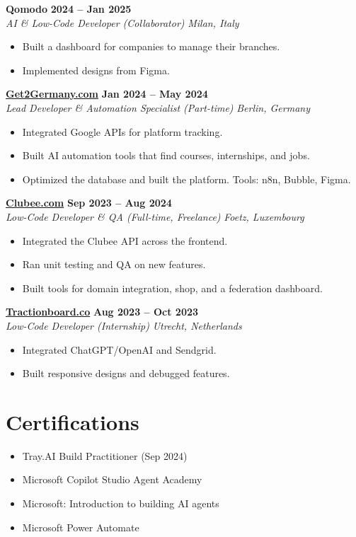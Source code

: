 \documentclass[a4paper,10pt]{article}
\newcommand{\role}[4]{%
  \textbf{#1} \hfill \textbf{#2}\\[1pt]%
  \textit{#3} \hfill \textit{#4}\\[2pt]%
}
\begin{document}
\role{Qomodo}{2024 -- Jan 2025}{AI \& Low-Code Developer (Collaborator)}{Milan, Italy}
\begin{itemize}
  \item Built a dashboard for companies to manage their branches.
  \item Implemented designs from Figma.
\end{itemize}

\role{\href{https://get2germany.com}{Get2Germany.com}}{Jan 2024 -- May 2024}{Lead Developer \& Automation Specialist (Part-time)}{Berlin, Germany}
\begin{itemize}
  \item Integrated Google APIs for platform tracking.
  \item Built AI automation tools that find courses, internships, and jobs.
  \item Optimized the database and built the platform. Tools: n8n, Bubble, Figma.
\end{itemize}

\role{\href{https://clubee.com}{Clubee.com}}{Sep 2023 -- Aug 2024}{Low-Code Developer \& QA (Full-time, Freelance)}{Foetz, Luxembourg}
\begin{itemize}
  \item Integrated the Clubee API across the frontend.
  \item Ran unit testing and QA on new features.
  \item Built tools for domain integration, shop, and a federation dashboard.
\end{itemize}

\role{\href{https://tractionboard.co}{Tractionboard.co}}{Aug 2023 -- Oct 2023}{Low-Code Developer (Internship)}{Utrecht, Netherlands}
\begin{itemize}
  \item Integrated ChatGPT/OpenAI and Sendgrid.
  \item Built responsive designs and debugged features.
\end{itemize}

\section{Certifications}
\begin{itemize}
  \item Tray.AI Build Practitioner (Sep 2024)
  \item Microsoft Copilot Studio Agent Academy
  \item Microsoft: Introduction to building AI agents
  \item Microsoft Power Automate
\end{itemize}
\end{document}
